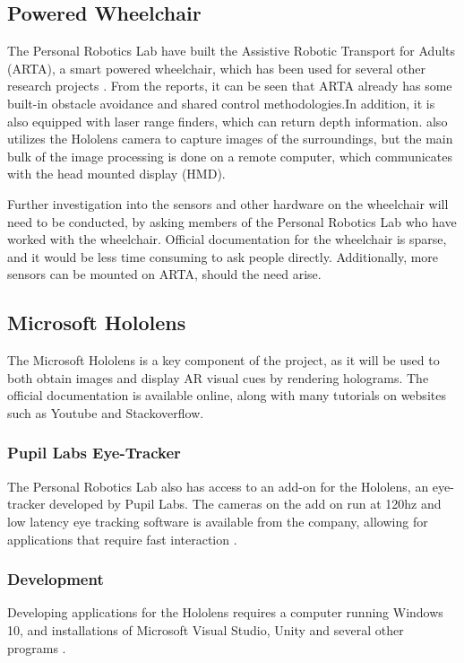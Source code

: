 \documentclass[12pt,a4paper]{report}
\begin{document}
\subsection{Powered Wheelchair}
The Personal Robotics Lab have built the Assistive Robotic Transport for Adults (ARTA), a smart powered wheelchair, which has been used for several other research projects \citep{Chacon-Quesada, Zolotas2018}. From the reports, it can be seen that ARTA already has some built-in obstacle avoidance and shared control methodologies.In addition, it is also equipped with laser range finders, which can return depth information. \cite{Chacon-Quesada} also utilizes the Hololens camera to capture images of the surroundings, but the main bulk of the image processing is done on a remote computer, which communicates with the head mounted display (HMD).

Further investigation into the sensors and other hardware on the wheelchair will need to be conducted, by asking members of the Personal Robotics Lab who have worked with the wheelchair. Official documentation for the wheelchair is sparse, and it would be less time consuming to ask people directly. Additionally, more sensors can be mounted on ARTA, should the need arise.

\subsection{Microsoft Hololens}
The Microsoft Hololens is a key component of the project, as it will be used to both obtain images and display AR visual cues by rendering holograms. The official documentation \citep{Microsofta} is available online, along with many tutorials on websites such as Youtube and Stackoverflow.

\subsubsection{Pupil Labs Eye-Tracker}
The Personal Robotics Lab also has access to an add-on for the Hololens, an eye-tracker developed by Pupil Labs. The cameras on the add on run at 120hz and low latency eye tracking software is available from the company, allowing for applications that require fast interaction \citep{PupilLabs}.

\subsubsection{Development}
Developing applications for the Hololens requires a computer running Windows 10, and installations of Microsoft Visual Studio, Unity and several other programs \citep{Microsofta}.
\end{document}
